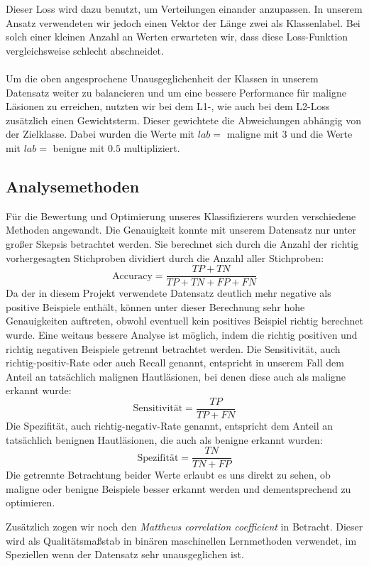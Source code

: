	Dieser Loss wird dazu benutzt, um Verteilungen einander anzupassen. In unserem Ansatz verwendeten wir jedoch einen Vektor der Länge zwei als Klassenlabel. Bei solch einer kleinen Anzahl an Werten erwarteten wir, dass diese Loss-Funktion vergleichsweise schlecht abschneidet.
\\
\\
Um die oben angesprochene Unausgeglichenheit der Klassen in unserem Datensatz weiter zu balancieren und um eine bessere Performance für maligne Läsionen zu erreichen, nutzten wir bei dem L1-, wie auch bei dem L2-Loss zusätzlich einen Gewichtsterm. Dieser gewichtete die Abweichungen abhängig von der Zielklasse. Dabei wurden die Werte mit $lab=$ maligne mit $3$ und die Werte mit $lab=$ benigne mit $0.5$ multipliziert. 
	  

\subsection{Analysemethoden}
\label{analysemethoden}

Für die Bewertung und Optimierung unseres Klassifizierers wurden verschiedene Methoden angewandt. Die Genauigkeit konnte mit unserem Datensatz nur unter großer Skepsis betrachtet werden. Sie berechnet sich durch die Anzahl der richtig vorhergesagten Stichproben dividiert durch die Anzahl aller Stichproben:
	\[\text{Accuracy} = \frac{TP+TN}{TP+TN+FP+FN}\]
Da der in diesem Projekt verwendete Datensatz deutlich mehr negative als positive Beispiele enthält, können unter dieser Berechnung sehr hohe Genauigkeiten auftreten, obwohl eventuell kein positives Beispiel richtig berechnet wurde.
Eine weitaus bessere Analyse ist möglich, indem die richtig positiven und richtig negativen Beispiele getrennt betrachtet werden. Die Sensitivität, auch richtig-positiv-Rate oder auch Recall genannt, entspricht in unserem Fall dem Anteil an tatsächlich malignen Hautläsionen, bei denen diese auch als maligne erkannt wurde:
\[\text{Sensitivität} = \frac{TP}{TP+FN}\]
Die Spezifität, auch richtig-negativ-Rate genannt, entspricht dem Anteil an tatsächlich benignen Hautläsionen, die auch als benigne erkannt wurden:
\[\text{Spezifität} = \frac{TN}{TN+FP}\]
Die getrennte Betrachtung beider Werte erlaubt es uns direkt zu sehen, ob maligne oder benigne Beispiele besser erkannt werden und dementsprechend zu optimieren.

Zusätzlich zogen wir noch den \textit{Matthews correlation coefficient} in Betracht. Dieser wird als Qualitätsmaßstab in binären maschinellen Lernmethoden verwendet, im Speziellen wenn der Datensatz sehr unausgeglichen ist. 

